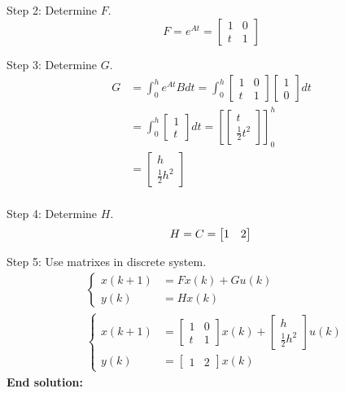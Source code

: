 \begin{multicols}{2}
Step 2: Determine $F$.
\begin{equation*}
    F = e^{At} = \begin{bmatrix} 1 & 0 \\ t & 1 \end{bmatrix}
\end{equation*}

Step 3: Determine $G$.
\begin{align*}
    G &= \int^h_0 e^{At}Bdt = \int^h_0\begin{bmatrix} 1 & 0 \\ t & 1 \end{bmatrix}\begin{bmatrix} 1 \\ 0 \end{bmatrix}dt \\
    &= \int^h_0\begin{bmatrix} 1 \\ t \end{bmatrix}dt = \left[\begin{bmatrix} t \\ \frac{1}{2}t^2 \end{bmatrix}\right]^h_0 \\
    &= \begin{bmatrix} h \\ \frac{1}{2}h^2 \end{bmatrix} \\
\end{align*}

Step 4: Determine $H$.
\begin{equation*}
    H = C = \begin{bmatrix} 1 & 2 \end{bmatrix} \\
\end{equation*}

Step 5: Use matrixes in discrete system.
\begin{align*}
    &\begin{cases}
        x(k+1) &= Fx(k) + Gu(k) \\
        y(k) &= Hx(k)
    \end{cases} \\
    &\begin{cases}
        x(k+1) &= \begin{bmatrix} 1 & 0 \\ t & 1 \end{bmatrix}x(k) + \begin{bmatrix} h \\ \frac{1}{2}h^2 \end{bmatrix}u(k) \\
        y(k) &= \begin{bmatrix} 1 & 2 \end{bmatrix}x(k)
    \end{cases}
\end{align*}
\textbf{End solution:}


\end{multicols}
